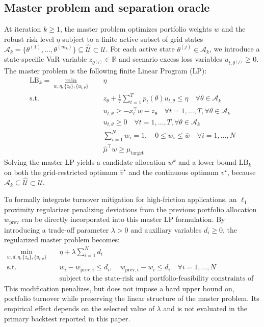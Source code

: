 \documentclass[smallextended]{svjour3}
\begin{document}
\subsection{Master problem and separation oracle}\label{sec:master_lp}
At iteration $k \ge 1$, the master problem optimizes portfolio weights $w$ and the robust risk level $\eta$ subject to a finite active subset of grid states $\mathcal{A}_k = \{\theta^{(1)}, \dots, \theta^{(m_k)}\} \subseteq \widehat{\mathcal{U}} \subset \mathcal{U}$. For each active state $\theta^{(j)} \in \mathcal{A}_k$, we introduce a state-specific VaR variable $z_{\theta^{(j)}} \in \mathbb{R}$ and scenario excess loss variables $u_{t, \theta^{(j)}} \ge 0$. The master problem is the following finite Linear Program (LP):
\begin{align}
    \mathrm{LB}_k = \min_{w, \eta, \{z_\theta\}, \{u_{t,\theta}\}} \quad & \eta \\
    \text{s.t.} \quad & z_\theta + \frac{1}{\tau} \sum_{t=1}^{T} p_t(\theta) u_{t,\theta} \le \eta \quad \forall \theta \in \mathcal{A}_k \\
    & u_{t,\theta} \ge -x_t^\top w - z_\theta \quad \forall t=1,\dots,T, \forall \theta \in \mathcal{A}_k \\
    & u_{t,\theta} \ge 0 \quad \forall t=1,\dots,T, \forall \theta \in \mathcal{A}_k \\
    & \sum_{i=1}^N w_i = 1, \quad 0 \le w_i \le \bar{w} \quad \forall i=1,\dots,N \\
    & \hat{\mu}^\top w \ge \mu_{\text{target}}
\end{align}
Solving the master LP yields a candidate allocation $w^k$ and a lower bound $\mathrm{LB}_k$ on both the grid-restricted optimum $\widehat v^\star$ and the continuous optimum $v^\star$, because $\mathcal{A}_k\subseteq\widehat{\mathcal{U}}\subset\mathcal{U}$.

To formally integrate turnover mitigation for high-friction applications, an $\ell_1$ proximity regularizer penalizing deviations from the previous portfolio allocation $w_{\mathrm{prev}}$ can be directly incorporated into this master LP formulation. By introducing a trade-off parameter $\lambda > 0$ and auxiliary variables $d_i \ge 0$, the regularized master problem becomes:
\begin{align}
    \min_{w, d, \eta, \{z_\theta\}, \{u_{t,\theta}\}} \quad & \eta + \lambda \sum_{i=1}^N d_i \\
    \text{s.t.} \quad & w_i - w_{\mathrm{prev}, i} \le d_i, \quad w_{\mathrm{prev}, i} - w_i \le d_i \quad \forall i=1,\dots,N \\
    & \text{subject to the state-risk and portfolio-feasibility constraints
of the unregularized master problem.} \nonumber
\end{align}
This modification penalizes, but does not impose a hard upper bound on,
portfolio turnover while preserving the linear structure of the master
problem. Its empirical effect depends on the selected value of $\lambda$
and is not evaluated in the primary backtest reported in this paper.
\end{document}
